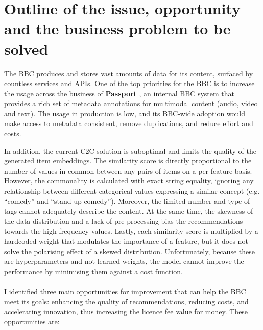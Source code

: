 
\section{Outline of the issue, opportunity and the business problem to be solved}

The BBC produces and stores vast amounts of data for its content, surfaced by countless services and APIs.
One of the top priorities for the BBC is to increase the usage across the business of \textbf{Passport} \cite{BBC:PassportMetadata},
an internal BBC system that provides a rich set of metadata annotations for multimodal content (audio, video and text).
The usage in production is low, and its BBC-wide adoption would make access to metadata consistent, remove duplications, and reduce effort and costs.

In addition, the current C2C solution is suboptimal and limits the quality of the generated item embeddings.
The similarity score is directly proportional to the number of values in common between any pairs of items
on a per-feature basis. However, the commonality is calculated with exact string equality,
ignoring any relationship between different categorical values expressing a similar concept (e.g. ``comedy'' and ``stand-up comedy'').
Moreover, the limited number and type of tags cannot adequately describe the content.
At the same time, the skewness of the data distribution and a lack of pre-processing bias the recommendations towards the high-frequency values.
Lastly, each similarity score is multiplied by a hardcoded weight that modulates the importance of a feature,
but it does not solve the polarising effect of a skewed distribution.
Unfortunately, because these are hyperparameters and not learned weights,
the model cannot improve the performance by minimising them against a cost function.
\\ \\
I identified three main opportunities for improvement that can help the BBC meet its goals:
enhancing the quality of recommendations, reducing costs, and accelerating innovation,
thus increasing the licence fee value for money. These opportunities are:

